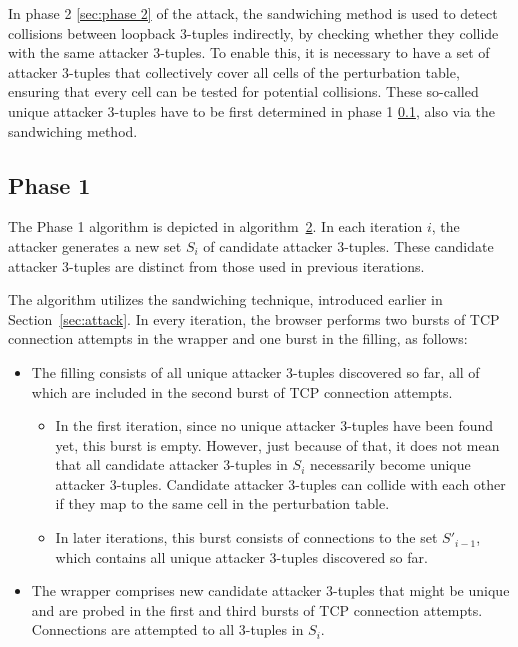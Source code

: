 \documentclass[twocolumn]{report}
\begin{document}
In phase 2 \ref{sec:phase 2} of the attack, the sandwiching method is used to detect collisions between loopback 3-tuples indirectly, by checking whether they collide with the same attacker 3-tuples. To enable this, it is necessary to have a set of attacker 3-tuples that collectively cover all cells of the perturbation table, ensuring that every cell can be tested for potential collisions. These so-called \alert{unique attacker 3-tuples} have to be first determined in phase 1 \ref{sec:phase 1}, also via the sandwiching method.

\subsection{Phase 1}
\label{sec:phase 1}

The Phase 1 algorithm is depicted in algorithm~\hyperref[alg:phase1]{2}. In each iteration $i$, the attacker generates a new set $S_i$ of \alert{candidate attacker 3-tuples}. These candidate attacker 3-tuples are distinct from those used in previous iterations.

The algorithm utilizes the \alert{sandwiching technique}, introduced earlier in Section~\ref{sec:attack}. In every iteration, the browser performs two bursts of TCP connection attempts in the wrapper and one burst in the filling, as follows:
\begin{itemize}
	\item The \alert{filling} consists of all \alert{unique attacker 3-tuples} discovered so far, all of which are included in the second burst of TCP connection attempts.
	\begin{itemize}
		\item In the first iteration, since no unique attacker 3-tuples have been found yet, this burst is \alert{empty}. However, just because of that, it does not mean that all candidate attacker 3-tuples in $S_i$ necessarily become unique attacker 3-tuples. Candidate attacker 3-tuples \alert{can collide with each other} if they map to the same cell in the perturbation table.
		\item In later iterations, this burst consists of connections to the set $S'_{i-1}$, which contains \alert{all unique attacker 3-tuples discovered so far}.
	\end{itemize}
	\item The \alert{wrapper} comprises new candidate attacker 3-tuples that might be unique and are probed in the first and third bursts of TCP connection attempts. Connections are attempted to all 3-tuples in $S_i$.
\end{itemize}
\end{document}
